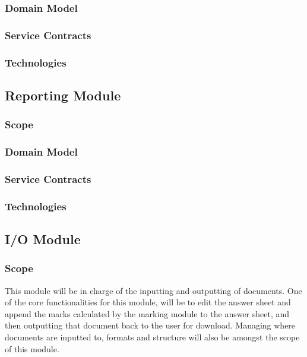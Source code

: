 \documentclass{article}
\begin{document}
		\subsubsection{Domain Model}
		\subsubsection{Service Contracts}
		\subsubsection{Technologies}
		
	\subsection{Reporting Module}
		\subsubsection{Scope}
		\subsubsection{Domain Model}
		\subsubsection{Service Contracts}
		\subsubsection{Technologies}
		
	\subsection{I/O Module}
		\subsubsection{Scope}
				This module will be in charge of the inputting and outputting of documents. One of the core functionalities
		for this module, will be to edit the answer sheet and append the marks calculated by the marking module
		to the answer sheet, and then outputting that document back to the user for download. Managing where
		documents are inputted to, formats and structure will also be amongst the scope of this module.
		
\end{document}
